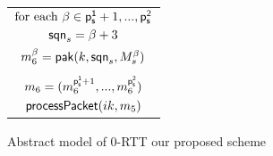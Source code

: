 \begin{figure*}[!htp]
\begin{center}
\begin{enumerate}
{\begin{minipage}[t]{0.38\textwidth}
   \centering
   \begin{tabular}{c}
    $\text{for each } \beta \in {\ensuremath{\mathsf{p_s^{1}}}+1,...,\ensuremath{\mathsf{p_s^{2}}}}$ \\
    $\mathsf{sqn}_s = \beta + 3$ \\
    $m_{6}^{\beta} = \mathsf{pak}(k, \mathsf{sqn}_s, M_s^{\beta})$ \\
    $ $ \\
    $m_{6} = (m_{6}^{\mathsf{p_s^{1}}+1},...,m_{6}^{\mathsf{p_s^{2}}})$ \\
    $\mathsf{processPacket}(ik, m_{5})$ \\
   \end{tabular}
  \end{minipage}%
 }
\end{enumerate}
 \caption{Abstract model of 0-RTT our proposed scheme}\label{fig:quic_prop_0rtt}
 \end{center}
\end{figure*}